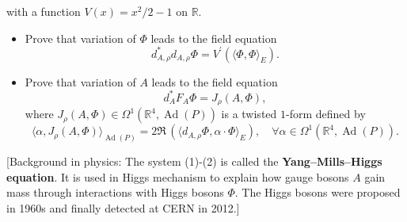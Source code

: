 with a function $V(x)=x^2/2-1$ on $\mathbb{R}$.
\begin{itemize}
\item Prove that variation of $\Phi$ leads to the field equation
\[d_{A, \rho}^* d_{A, \rho} \Phi=V^{\prime}(\langle\Phi, \Phi\rangle_E).\tag{1}\]
\item Prove that variation of $A$ leads to the field equation
\[d_A^* F_A \Phi=J_\rho(A, \Phi),\]
where $J_\rho(A, \Phi) \in \Omega^1(\mathbb{R}^4, \operatorname{Ad}(P))$ is a twisted $1$-form defined by
\[\langle\alpha, J_\rho(A, \Phi)\rangle_{\operatorname{Ad}(P)}
=2 \Re\,(\langle d_{A, \rho} \Phi, \alpha \cdot \Phi \rangle_E), 
\quad \forall \alpha \in \Omega^1(\mathbb{R}^4, \operatorname{Ad}(P)).\tag{2}\]
\end{itemize}
[Background in physics: The system (1)-(2) is called the \textbf{Yang--Mills--Higgs equation}. 
It is used in Higgs mechanism to explain how gauge bosons $A$ gain mass through interactions with Higgs bosons $\Phi$. 
The Higgs bosons were proposed in 1960s and finally detected at CERN in 2012.]